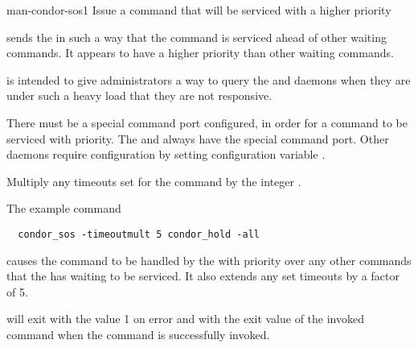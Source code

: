 \begin{ManPage}{}{man-condor-sos}{1}
{Issue a command that will be serviced with a higher priority}

\Synopsis {}
\ToolArgsBase


\Description
{} sends the  in such a way 
that the command is serviced ahead of other waiting commands.
It appears to have a higher priority than other waiting commands.

 is intended to give administrators a way to query the
 and  daemons when they are under
such a heavy load that they are not responsive. 

There must be a special command port configured, 
in order for a command to be serviced with priority.
The  and  always have the special
command port.
Other daemons require configuration by setting
configuration variable .

\begin{Options}
  \ToolArgsBaseDesc
    {Multiply any timeouts set for the command by the integer .  }
\end{Options}

\Examples

The example command
\begin{verbatim}
  condor_sos -timeoutmult 5 condor_hold -all
\end{verbatim}
causes the  command to be handled by the
 with priority over any other commands that the 
has waiting to be serviced.
It also extends any set timeouts by a factor of 5.

\ExitStatus

 will exit with the value 1 on error and with the
exit value of the invoked command when the command is successfully
invoked. 

\end{ManPage}

